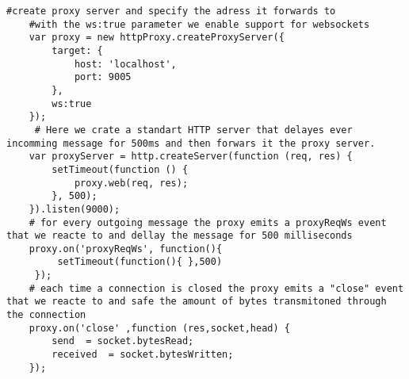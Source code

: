  \begin{lstlisting}[caption={Setting up a proxy that simulates latency with node-http-proxy}]
	#create proxy server and specify the adress it forwards to
	#with the ws:true parameter we enable support for websockets
 	var proxy = new httpProxy.createProxyServer({
 		target: {
 			host: 'localhost',
 			port: 9005
 		},
 		ws:true 
 	});
 	 # Here we crate a standart HTTP server that delayes ever incomming message for 500ms and then forwars it the proxy server.
 	var proxyServer = http.createServer(function (req, res) {
 		setTimeout(function () {
 			proxy.web(req, res);
 		}, 500);
 	}).listen(9000);
 	# for every outgoing message the proxy emits a proxyReqWs event that we reacte to and dellay the message for 500 milliseconds
 	proxy.on('proxyReqWs', function(){
 		 setTimeout(function(){ },500) 
 	 });
  	# each time a connection is closed the proxy emits a "close" event that we reacte to and safe the amount of bytes transmitoned through the connection
 	proxy.on('close' ,function (res,socket,head) { 
 		send  = socket.bytesRead;
 		received  = socket.bytesWritten;
 	});
 \end{lstlisting}



 
